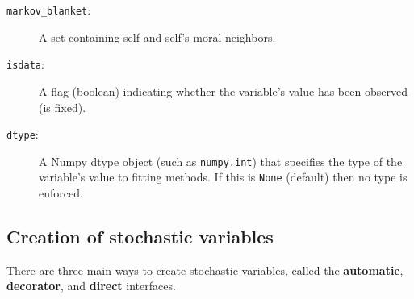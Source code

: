 \begin{description}
    \item[\texttt{markov_blanket}:] A set containing self and self's moral neighbors.
    \item[\texttt{isdata}:] A flag (boolean) indicating whether the variable's value has been observed (is fixed).
    \item[\texttt{dtype}:] A Numpy dtype object (such as \texttt{numpy.int}) that specifies the type of the variable's value to fitting methods. If this is \texttt{None} (default) then no type is enforced.
\end{description}

\subsection{Creation of stochastic variables}
There are three main ways to create stochastic variables, called the \textbf{automatic}, \textbf{decorator}, and \textbf{direct} interfaces.


